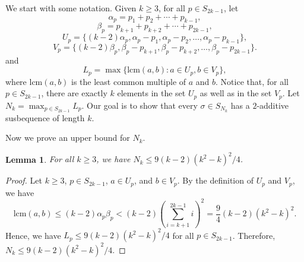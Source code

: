 \documentclass[10pt,a4paper]{amsart}
\newtheorem{lemma}[theorem]{Lemma}
\begin{document}
We start with some notation. Given $k\geq3$, for all $p\in S_{2k-1}$, let \[\alpha_p=p_1+p_2+\cdots+p_{k-1},\] \[\beta_p=p_{k+1}+p_{k+2}+\cdots+p_{2k-1},\]
    \[
    U_p=\{(k-2)\alpha_p,\alpha_p-p_1,\alpha_p-p_2,\ldots,\alpha_p-p_{k-1}\},
    \]
    \[
    V_p=\{(k-2)\beta_p,\beta_p-p_{k+1},\beta_p-p_{k+2},\ldots,\beta_p-p_{2k-1}\}.
    \]
    and \[L_p=\max\{\text{lcm}(a,b):a\in U_p,b\in V_p\},\] where $\text{lcm}(a,b)$ is the least common multiple of $a$ and $b$. Notice that, for all $p\in S_{2k-1}$, there are exactly $k$ elements in the set $U_p$ as well as in the set $V_p$. Let $N_k=\max_{p\in S_{2k-1}}L_p$. Our goal is to show that every $\sigma\in S_{N_k}$ has a $2$-additive susbequence of length $k$.

Now we prove an upper bound for $N_k$.

\begin{lemma}\label{Lemma:UppderBoundN}
For all $k\geq3$, we have $N_k\leq 9(k-2)(k^2-k)^2/4$.
\end{lemma}
\begin{proof}
Let $k\geq3$, $p\in S_{2k-1}$, $a\in U_p$, and $b\in V_p$. By the definition of $U_p$ and $V_p$, we have
\[
\text{lcm}(a,b)\leq(k-2)\alpha_p\beta_p<(k-2)\left(\sum_{i=k+1}^{2k-1}i\right)^2=\frac{9}{4}(k-2)(k^2-k)^2.
\]
Hence, we have $L_p\leq 9(k-2)(k^2-k)^2/4$ for all $p\in S_{2k-1}$. Therefore, $N_k\leq 9(k-2)(k^2-k)^2/4$.
\end{proof}
    
\end{document}

